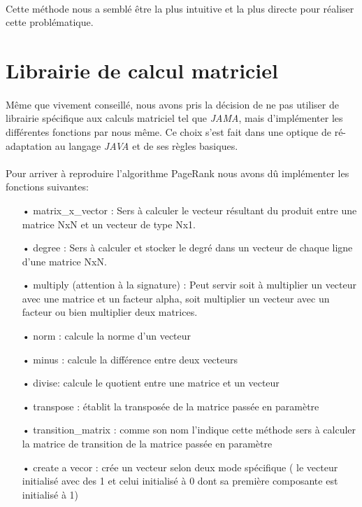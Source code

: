 \documentclass[10pt,a4paper]{article}
\begin{document}

\paragraph{}Cette méthode nous a semblé être la plus intuitive et la plus directe pour réaliser cette problématique.

\section{Librairie de calcul matriciel}

\paragraph{}Même que vivement conseillé, nous avons pris la décision de ne pas utiliser de librairie spécifique aux calculs matriciel tel que \textit{JAMA}, mais d'implémenter les différentes fonctions par nous même. Ce choix s'est fait dans une optique de ré-adaptation au langage \textit{JAVA} et de ses règles basiques.

\paragraph{}Pour arriver à reproduire l'algorithme PageRank nous avons dû implémenter les fonctions suivantes:

\hspace{1.5cm}

\begin{itemize}
    \item[•] matrix\_x\_vector : Sers à calculer le vecteur résultant du produit entre une matrice NxN et un vecteur de type Nx1.
    \item[•] degree : Sers à calculer et stocker le degré dans un vecteur de chaque ligne d'une matrice NxN.
    \item[•] multiply (attention à la signature) : Peut servir soit à multiplier un vecteur avec une matrice et un facteur alpha, soit multiplier un vecteur avec un facteur ou bien multiplier deux matrices.
    \item[•] norm : calcule la norme d'un vecteur
    \item[•] minus : calcule la différence entre deux vecteurs
    \item[•] divise: calcule le quotient entre une matrice et un vecteur
    \item[•] transpose : établit la transposée de la matrice passée en paramètre
    \item[•] transition\_matrix : comme son nom l'indique cette méthode sers à calculer la matrice de transition de la matrice passée en paramètre
    \item[•] create a vecor : crée un vecteur selon deux mode spécifique ( le vecteur initialisé avec des 1 et celui initialisé à 0 dont sa première composante est initialisé à 1)
\end{itemize}
\end{document}
